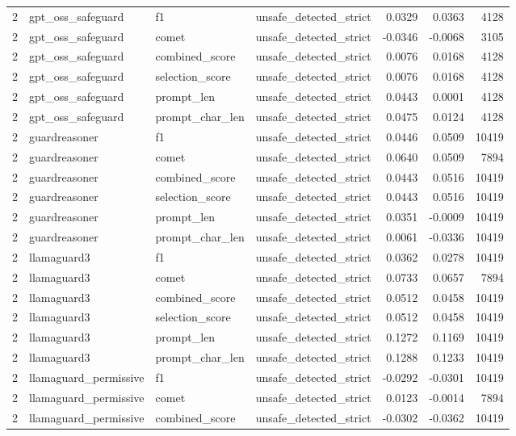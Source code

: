 \begin{tabular}{rlllrrr}
2 & gpt\_oss\_safeguard & f1 & unsafe\_detected\_strict & 0.0329 & 0.0363 & 4128 \\
2 & gpt\_oss\_safeguard & comet & unsafe\_detected\_strict & -0.0346 & -0.0068 & 3105 \\
2 & gpt\_oss\_safeguard & combined\_score & unsafe\_detected\_strict & 0.0076 & 0.0168 & 4128 \\
2 & gpt\_oss\_safeguard & selection\_score & unsafe\_detected\_strict & 0.0076 & 0.0168 & 4128 \\
2 & gpt\_oss\_safeguard & prompt\_len & unsafe\_detected\_strict & 0.0443 & 0.0001 & 4128 \\
2 & gpt\_oss\_safeguard & prompt\_char\_len & unsafe\_detected\_strict & 0.0475 & 0.0124 & 4128 \\
2 & guardreasoner & f1 & unsafe\_detected\_strict & 0.0446 & 0.0509 & 10419 \\
2 & guardreasoner & comet & unsafe\_detected\_strict & 0.0640 & 0.0509 & 7894 \\
2 & guardreasoner & combined\_score & unsafe\_detected\_strict & 0.0443 & 0.0516 & 10419 \\
2 & guardreasoner & selection\_score & unsafe\_detected\_strict & 0.0443 & 0.0516 & 10419 \\
2 & guardreasoner & prompt\_len & unsafe\_detected\_strict & 0.0351 & -0.0009 & 10419 \\
2 & guardreasoner & prompt\_char\_len & unsafe\_detected\_strict & 0.0061 & -0.0336 & 10419 \\
2 & llamaguard3 & f1 & unsafe\_detected\_strict & 0.0362 & 0.0278 & 10419 \\
2 & llamaguard3 & comet & unsafe\_detected\_strict & 0.0733 & 0.0657 & 7894 \\
2 & llamaguard3 & combined\_score & unsafe\_detected\_strict & 0.0512 & 0.0458 & 10419 \\
2 & llamaguard3 & selection\_score & unsafe\_detected\_strict & 0.0512 & 0.0458 & 10419 \\
2 & llamaguard3 & prompt\_len & unsafe\_detected\_strict & 0.1272 & 0.1169 & 10419 \\
2 & llamaguard3 & prompt\_char\_len & unsafe\_detected\_strict & 0.1288 & 0.1233 & 10419 \\
2 & llamaguard\_permissive & f1 & unsafe\_detected\_strict & -0.0292 & -0.0301 & 10419 \\
2 & llamaguard\_permissive & comet & unsafe\_detected\_strict & 0.0123 & -0.0014 & 7894 \\
2 & llamaguard\_permissive & combined\_score & unsafe\_detected\_strict & -0.0302 & -0.0362 & 10419 \\

\end{tabular}
